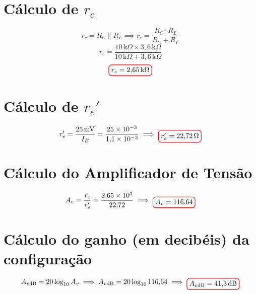 \documentclass[12pt,openany,oneside,a4paper]{abntex2}
\begin{document}
\section{Cálculo de $r_c$}
\[
r_c = {R_C \parallel R_L} \implies r_c = \frac{R_C \cdot R_L}{R_C + R_L}
\]
\[
r_c = \frac{10 \, \text{k}\Omega \times 3{,}6 \, \text{k}\Omega}{10 \, \text{k}\Omega + 3{,}6 \, \text{k}\Omega}
\]
\[
\tikz[baseline]{\node[draw=red, thick, rounded corners] {$r_c = 2{,}65 \, \text{k}\Omega$};}
\]

\section{Cálculo de $r_e'$}
\[
r_e^{\prime} = \frac{25 \, \text{mV}}{I_E} = \frac{25 \times 10^{-3}}{1{,}1 \times 10^{-3}} \implies \tikz[baseline]{\node[draw=red, thick, rounded corners] {$r_e^{\prime} = 22{,}72 \, \Omega$};}
\]

\section{Cálculo do Amplificador de Tensão}
\[
A_v = \frac{r_c}{r_e'} = \frac{2{,}65 \times 10^3}{22{,}72} \implies \tikz[baseline]{\node[draw=red, thick, rounded corners] {$A_v = 116{,}64$};}
\]

\section{Cálculo do ganho (em decibéis) da configuração}
\[
A_{v\text{dB}} = 20 \log_{10} A_v \implies A_{v\text{dB}} = 20 \log_{10} 116{,}64 \implies \tikz[baseline]{\node[draw=red, thick, rounded corners] {$A_{v\text{dB}} = 41{,}3 \, \text{dB}$};}
\]
\end{document}
